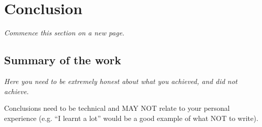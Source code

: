 
\section{Conclusion}

{\slshape
Commence this section on a new page.
}

\subsection{Summary of the work}

{\slshape
Here you need to be extremely honest about what you achieved, and did not
achieve.

Conclusions need to be technical and MAY NOT relate to your personal
experience (e.g. ``I learnt a lot'' would be a good example of what NOT
to write).
}

\newpage



